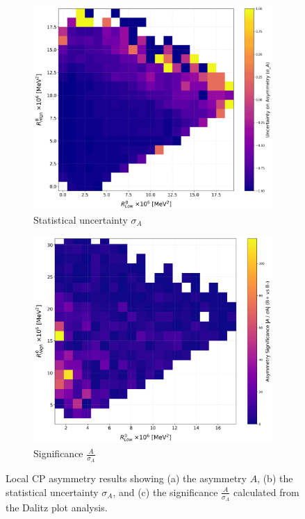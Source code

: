 \begin{figure}[H]
\begin{subfigure}[b]{0.3\textwidth}
        \includegraphics[width=\textwidth]{Figure/hist_dalitz_uncertainty.png}
        \caption{Statistical uncertainty \(\sigma_A\)}
        \label{fig:dalitz_uncertainty}
    \end{subfigure}
    \hfill
    \begin{subfigure}[b]{0.3\textwidth}
        \includegraphics[width=\textwidth]{Figure/hist_dalitz_sign.png}
        \caption{Significance \(\frac{A}{\sigma_A}\)}
        \label{fig:dalitz_significance}
    \end{subfigure}
    \caption{Local CP asymmetry results showing (a) the asymmetry \(A\), (b) the statistical uncertainty \(\sigma_A\), and (c) the significance \(\frac{A}{\sigma_A}\) calculated from the Dalitz plot analysis.}
    \label{hist_local}
\end{figure}

